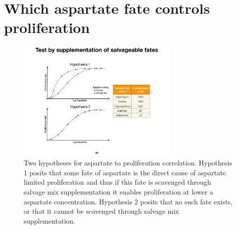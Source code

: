 \section{Which aspartate fate controls proliferation}






\begin{figure}
    \centering
    \includegraphics[width=0.70\textwidth]{figures/chap1/asp_fates_suppl_hypo.pdf}
    \caption[Two hypotheses for aspartate to proliferation correlation]{
    Two hypotheses for aspartate to proliferation correlation.
    Hypothesis 1 posits that some fate of aspartate is the direct cause of aspartate limited proliferation and thus if this fate is scavenged through salvage mix supplementation it enables proliferation at lower a aspartate concentration.
    Hypothesis 2 posits that no such fate exists, or that it cannot be scavenged through salvage mix supplementation.
    }
    \label{fig:ch1:asp_fates_suppl_hypo}
\end{figure}





